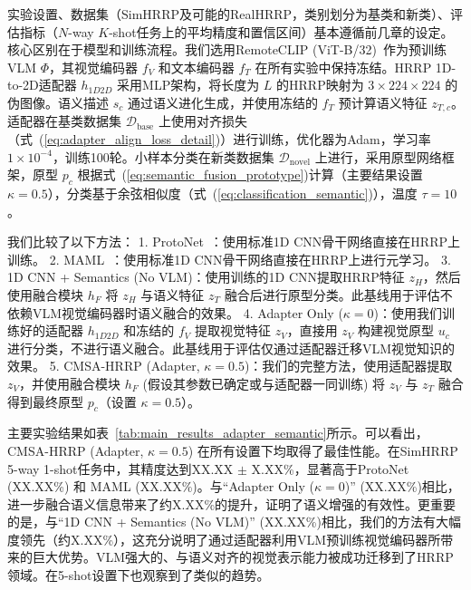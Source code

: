 实验设置、数据集（SimHRRP及可能的RealHRRP，类别划分为基类和新类）、评估指标（$N$-way $K$-shot任务上的平均精度和置信区间）基本遵循前几章的设定。核心区别在于模型和训练流程。我们选用RemoteCLIP (ViT-B/32)~\cite{RemoteCLIP}作为预训练VLM $\Phi$，其视觉编码器 $f_V$ 和文本编码器 $f_T$ 在所有实验中保持冻结。HRRP 1D-to-2D适配器 $h_{1D2D}$ 采用MLP架构，将长度为 $L$ 的HRRP映射为 $3 \times 224 \times 224$ 的伪图像。语义描述 $s_c$ 通过语义进化生成，并使用冻结的 $f_T$ 预计算语义特征 $z_{T,c}$。适配器在基类数据集 $\mathcal{D}_{\text{base}}$ 上使用对齐损失（式~(\ref{eq:adapter_align_loss_detail})）进行训练，优化器为Adam，学习率 $1 \times 10^{-4}$，训练100轮。小样本分类在新类数据集 $\mathcal{D}_{\text{novel}}$ 上进行，采用原型网络框架，原型 $p_c$ 根据式~(\ref{eq:semantic_fusion_prototype})计算（主要结果设置 $\kappa=0.5$），分类基于余弦相似度（式~(\ref{eq:classification_semantic})），温度 $\tau=10$。

我们比较了以下方法：
1.  ProtoNet~\cite{Snell2017ProtoNet}：使用标准1D CNN骨干网络直接在HRRP上训练。
2.  MAML~\cite{Finn2017MAML}：使用标准1D CNN骨干网络直接在HRRP上进行元学习。
3.  1D CNN + Semantics (No VLM)：使用训练的1D CNN提取HRRP特征 $z_H$，然后使用融合模块 $h_F$ 将 $z_H$ 与语义特征 $z_T$ 融合后进行原型分类。此基线用于评估不依赖VLM视觉编码器时语义融合的效果。
4.  Adapter Only ($\kappa=0$)：使用我们训练好的适配器 $h_{1D2D}$ 和冻结的 $f_V$ 提取视觉特征 $z_V$，直接用 $z_V$ 构建视觉原型 $u_c$ 进行分类，不进行语义融合。此基线用于评估仅通过适配器迁移VLM视觉知识的效果。
5.  CMSA-HRRP (Adapter, $\kappa=0.5$)：我们的完整方法，使用适配器提取 $z_V$，并使用融合模块 $h_F$ (假设其参数已确定或与适配器一同训练) 将 $z_V$ 与 $z_T$ 融合得到最终原型 $p_c$（设置 $\kappa=0.5$）。

主要实验结果如表~\ref{tab:main_results_adapter_semantic}所示。可以看出，CMSA-HRRP (Adapter, $\kappa=0.5$) 在所有设置下均取得了最佳性能。在SimHRRP 5-way 1-shot任务中，其精度达到XX.XX $\pm$ X.XX\%，显著高于ProtoNet (XX.XX\%) 和 MAML (XX.XX\%)。与“Adapter Only ($\kappa=0$)” (XX.XX\%)相比，进一步融合语义信息带来了约X.XX\%的提升，证明了语义增强的有效性。更重要的是，与“1D CNN + Semantics (No VLM)” (XX.XX\%)相比，我们的方法有大幅度领先（约X.XX\%），这充分说明了通过适配器利用VLM预训练视觉编码器所带来的巨大优势。VLM强大的、与语义对齐的视觉表示能力被成功迁移到了HRRP领域。在5-shot设置下也观察到了类似的趋势。

